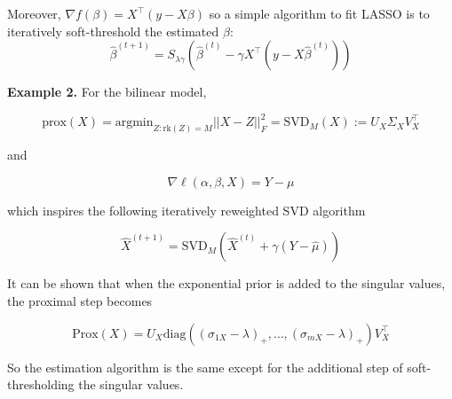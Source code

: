 \documentclass{article}
\begin{document}
Moreover, $\nabla f(\beta) = X^{\top} (y - X \beta)$ so a simple algorithm to fit LASSO is to iteratively soft-threshold the estimated $\beta$:
\begin{equation}
\hat{\beta}^{(t+1)} = S_{\lambda \gamma} \left( \hat{\beta}^{(t)} - \gamma X^{\top}(y-X\hat{\beta}^{(t)}) \right)
\end{equation}

\medskip 

\textbf{Example 2.} For the bilinear model, 

\begin{equation}
\text{prox}(X) = \text{argmin}_{Z:\text{rk}(Z) = M} ||X - Z||_F^2 = \text{SVD}_M(X) := U_X \Sigma_X V^{\top}_X
\end{equation}

and 

\begin{equation}
\nabla \ell(\alpha, \beta, X) = Y - \mu 
\end{equation}

which inspires the following iteratively reweighted SVD algorithm 

\begin{equation}
\hat{X}^{(t + 1)} = \text{SVD}_M \left( \hat{X}^{(t)} + \gamma (Y - \hat{\mu}) \right)
\end{equation}

\bigskip 

It can be shown that when the exponential prior is added to the singular values, the proximal step becomes 

\begin{equation}
\text{Prox}(X) = U_X \text{diag}((\sigma_{1X} - \lambda)_+, \ldots, (\sigma_{mX} - \lambda)_+) V^{\top}_X
\end{equation}

So the estimation algorithm is the same except for the additional step of soft-thresholding the singular values.


\end{document}
